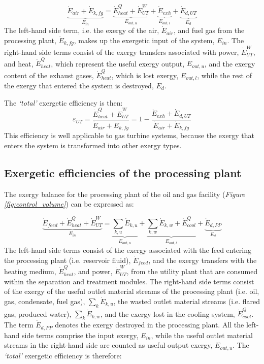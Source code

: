 \begin{equation}
	\underbrace{\dot{E}_{air}+\dot{E}_{k,fg}}_{E_{in}}=\underbrace{\dot{E}^{Q}_{heat}+\dot{E}^{W}_{UT}}_{E_{out,u}}+\underbrace{\dot{E}_{exh}}_{E_{out,l}}+\underbrace{\dot{E}_{d,UT}}_{E_d}
\end{equation}
The left-hand side term, i.e. the exergy of the air, $\dot{E}_{air}$, and fuel gas from the processing plant, $\dot{E}_{k,fg}$, makes up the exergetic input of the system, $E_{in}$. The right-hand side terms consist of the exergy transfers associated with power, $\dot{E}^{W}_{UT}$, and heat, $\dot{E}^{Q}_{heat}$, which represent the useful exergy output, $E_{out,u}$, and the exergy content of the exhaust gases, $\dot{E}^{Q}_{heat}$, which is lost exergy, $E_{out,l}$, while the rest of the exergy that entered the system is destroyed, $E_d$.

The \emph{`total'} exergetic efficiency is then: 
\begin{equation}
	\varepsilon_{UT} =\frac{\dot{E}^{Q}_{heat}+\dot{E}^{W}_{UT}}{\dot{E}_{air}+\dot{E}_{k,fg}}=1-\frac{\dot{E}_{exh}+\dot{E}_{d,UT}}{\dot{E}_{air}+\dot{E}_{k,fg}}
\end{equation}
This efficiency is well applicable to gas turbine systems, because the exergy that enters the system is transformed into other exergy types.



\subsection{Exergetic efficiencies of the processing plant}
\label{section:eff_processing}

The exergy balance for the processing plant of the oil and gas facility (\emph{Figure \ref{fig:control_volume}}) can be expressed as:

\begin{equation}
\label{eq:balance_PP}
	\underbrace{\dot{E}_{feed}+\dot{E}^{Q}_{heat}+\dot{E}^{W}_{UT}}_{E_{in}}=\underbrace{\sum_{k,u}\dot{E}_{k,u}}_{E_{out,u}}+\underbrace{\sum_{k,w}\dot{E}_{k,w}+\dot{E}^{Q}_{cool}}_{E_{out,l}}+\underbrace{\dot{E}_{d,PP}}_{E_d}
\end{equation}
The left-hand side terms consist of the exergy associated with the feed entering the processing plant (i.e. reservoir fluid), $\dot{E}_{feed}$, and the exergy transfers with the heating medium, $\dot{E}^{Q}_{heat}$, and power, $\dot{E}^{W}_{UT}$, from the utility plant that are consumed within the separation and treatment modules. The right-hand side terms consist of the exergy of the useful outlet material streams of the processing plant (i.e. oil, gas, condensate, fuel gas), $\sum_k\dot{E}_{k,u}$, the wasted outlet material streams (i.e. flared gas, produced water), $\sum_k\dot{E}_{k,w}$, and the exergy lost in the cooling system, $\dot{E}^{Q}_{cool}$. The term $\dot{E}_{d,PP}$ denotes the exergy destroyed in the processing plant. All the left-hand side terms comprise the input exergy, $E_{in}$, while the useful outlet material streams in the right-hand side are counted as useful output exergy, $E_{out,u}$. The \emph{`total'} exergetic efficiency is therefore:  

